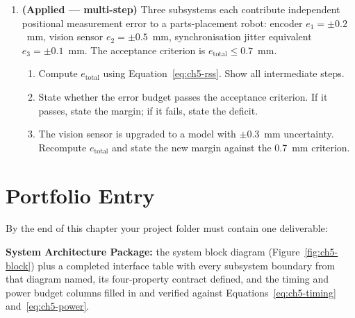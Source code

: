 \begin{enumerate}
  \item \textbf{(Applied --- multi-step)}
        Three subsystems each contribute independent positional measurement error to a parts-placement robot:
        encoder $e_1 = \pm 0.2$~mm, vision sensor $e_2 = \pm 0.5$~mm, synchronisation jitter equivalent $e_3 = \pm 0.1$~mm.
        The acceptance criterion is $e_{\text{total}} \leq 0.7$~mm.
        \begin{enumerate}
          \item Compute $e_{\text{total}}$ using Equation~\ref{eq:ch5-rss}.
                Show all intermediate steps.
          \item State whether the error budget passes the acceptance criterion.
                If it passes, state the margin; if it fails, state the deficit.
          \item The vision sensor is upgraded to a model with $\pm 0.3$~mm uncertainty.
                Recompute $e_{\text{total}}$ and state the new margin against the 0.7~mm criterion.
        \end{enumerate}

\end{enumerate}

\section*{Portfolio Entry}
\label{sec:ch5-artifact}

By the end of this chapter your project folder must contain one deliverable:

\medskip
\noindent\textbf{System Architecture Package:} the system block diagram (Figure~\ref{fig:ch5-block}) plus a completed interface table with every subsystem boundary from that diagram named, its four-property contract defined, and the timing and power budget columns filled in and verified against Equations~\ref{eq:ch5-timing} and~\ref{eq:ch5-power}.

